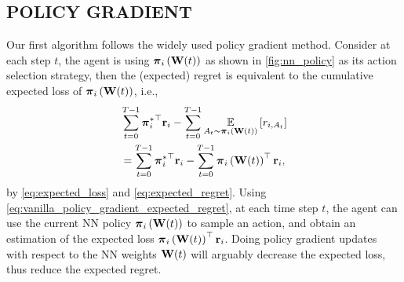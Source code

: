 

\subsection{POLICY GRADIENT}
\label{subsec:policy_gradient}

Our first algorithm follows the widely used policy gradient method. 
Consider at each step $t$, the agent is using ${\boldsymbol{\pi}}_i\left({\mathbf{W}}(t)\right)$ as shown in \cref{fig:nn_policy} as its action selection strategy, then the (expected) regret is equivalent to the cumulative expected loss of ${\boldsymbol{\pi}}_i\left({\mathbf{W}}(t)\right)$, i.e., 
\begin{equation}
\label{eq:vanilla_policy_gradient_expected_regret}
\begin{split}
    &\sum\limits_{t=0}^{T-1}{{{\boldsymbol{\pi}}_i^*}^\top {\mathbf{r}}_i} - \sum\limits_{t=0}^{T-1}{ \operatorname*{{\mathbb{E}}}\limits_{A_t \sim {\boldsymbol{\pi}}_i\left({\mathbf{W}}(t)\right)} \left[ r_{i, A_t} \right] } \\
    &= \sum\limits_{t=0}^{T-1}{{{\boldsymbol{\pi}}_i^*}^\top {\mathbf{r}}_i} - \sum\limits_{t=0}^{T-1}{{\boldsymbol{\pi}}_i\left({\mathbf{W}}(t)\right)^\top {\mathbf{r}}_i},
\end{split}
\end{equation}
by \cref{eq:expected_loss} and \cref{eq:expected_regret}. Using \cref{eq:vanilla_policy_gradient_expected_regret}, at each time step $t$, the agent can use the current NN policy ${\boldsymbol{\pi}}_i\left({\mathbf{W}}(t)\right)$ to sample an action, and obtain an estimation of the expected loss ${\boldsymbol{\pi}}_i\left({\mathbf{W}}(t)\right)^\top {\mathbf{r}}_i$. Doing policy gradient updates with respect to the NN weights ${\mathbf{W}}(t)$ will arguably decrease the expected loss, thus reduce the expected regret. 

